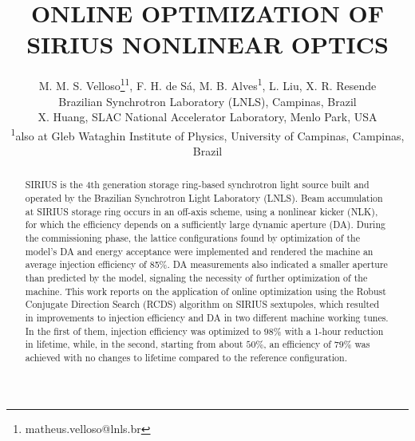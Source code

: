 \documentclass[a4paper,
               keeplastbox,   %
               ]{jacow}
\begin{document}
\title{ONLINE OPTIMIZATION OF SIRIUS NONLINEAR OPTICS}

\author{M. M. S. Velloso\thanks{matheus.velloso@lnls.br}\textsuperscript{1}, F. H. de Sá, M. B. Alves\textsuperscript{1}, L. Liu, X. R. Resende\\ Brazilian Synchrotron Laboratory (LNLS), Campinas, Brazil \\
		X. Huang, SLAC National Accelerator Laboratory, Menlo Park, USA \\
		\textsuperscript{1}also at Gleb Wataghin Institute of Physics, University of Campinas, Campinas, Brazil 
}
	
\maketitle
%
\begin{abstract}
SIRIUS is the 4th generation storage ring-based synchrotron light source built and operated by the Brazilian Synchrotron Light Laboratory (LNLS). Beam accumulation at SIRIUS storage ring occurs in an off-axis scheme, using a nonlinear kicker (NLK), for which the efficiency depends on a sufficiently large dynamic aperture (DA). During the commissioning phase, the lattice configurations found by optimization of the model's DA and energy acceptance were implemented and rendered the machine an average injection efficiency of 85\%. DA measurements also indicated a smaller aperture than predicted by the model, signaling the necessity of further optimization of the machine. 
This work reports on the application of online optimization using the Robust Conjugate Direction Search (RCDS) algorithm on SIRIUS sextupoles, which resulted in improvements to injection efficiency and DA in two different machine working tunes. In the first of them, injection efficiency was optimized to $98\%$ with a 1-hour reduction in lifetime, while, in the second, starting from about $50\%$, an efficiency of $79\%$ was achieved with no changes to lifetime compared to the reference configuration. 
\end{abstract}
\end{document}

